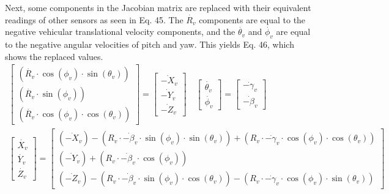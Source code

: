 \documentclass[a4paper]{IEEEtran}
\begin{document}
Next, some components in the Jacobian matrix are replaced with their equivalent readings of other sensors as seen in Eq. 45. The $\dot{R_{v}}$ components are equal to the negative vehicular translational velocity components, and the $\dot{\theta_{v}}$ and $\dot{\phi_{v}}$ are equal to the negative angular velocities of pitch and yaw. This yields Eq. 46, which shows the replaced values.
\begingroup\makeatletter\def\f@size{7}\check@mathfonts
\begin{gather}
\left[\begin{array}{c}
\left(\dot{R_{v}}\cdot\cos\left(\phi_{v}\right)\cdot\sin\left(\theta_{v}\right)\right)\\
\left(\dot{R_{v}}\cdot\sin\left(\phi_{v}\right)\right)\\
\left(\dot{R_{v}}\cdot\cos\left(\phi_{v}\right)\cdot\cos\left(\theta_{v}\right)\right)
\end{array}\right]=\left[\begin{array}{c}
\dot{-X_{v}}\\
\dot{-Y_{v}}\\
\dot{-Z_{v}}
\end{array}\right]\quad\left[\begin{array}{c}
\dot{\theta_{v}}\\
\dot{\phi_{v}}
\end{array}\right]=\left[\begin{array}{c}
\dot{-\gamma_{v}}\\
\dot{-\beta_{v}}
\end{array}\right] \\
\left[\begin{array}{c}
\dot{X_{v}}\\
\dot{Y_{v}}\\
\dot{Z_{v}}
\end{array}\right]=\left[\begin{array}{c}
\left(\dot{-X_{v}}\right)-\left(R_{v}\cdot\dot{-\beta_{v}}\cdot\sin\left(\phi_{v}\right)\cdot\sin\left(\theta_{v}\right)\right)+\left(R_{v}\cdot\dot{-\gamma_{v}}\cdot\cos\left(\phi_{v}\right)\cdot\cos\left(\theta_{v}\right)\right)\\
\left(\dot{-Y_{v}}\right)+\left(R_{v}\cdot\dot{-\beta_{v}}\cdot\cos\left(\phi_{v}\right)\right)\\
\left(\dot{-Z_{v}}\right)-\left(R_{v}\cdot\dot{-\beta_{v}}\cdot\sin\left(\phi_{v}\right)\cdot\cos\left(\theta_{v}\right)\right)-\left(R_{v}\cdot\dot{-\gamma_{v}}\cdot\cos\left(\phi_{v}\right)\cdot\sin\left(\theta_{v}\right)\right)
\end{array}\right]
\end{gather}
\endgroup
\end{document}

